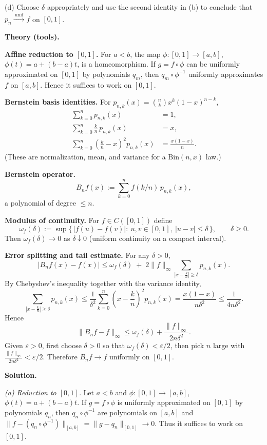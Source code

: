 \documentclass[12pt,a4paper]{article}
\begin{document}
\medskip
(d)\; Choose $\delta$ appropriately and use the second identity in (b) to conclude that
$p_n \xrightarrow{\ \mathrm{unif}\ } f$ on $[0,1]$.

\medskip
\textbf{Theory (tools).}

\textbf{Affine reduction to $[0,1]$.}
For $a<b$, the map $\phi:[0,1]\to[a,b]$, $\phi(t)=a+(b-a)t$, is a homeomorphism.
If $g=f\circ\phi$ can be uniformly approximated on $[0,1]$ by polynomials $q_m$, then
$q_m\circ\phi^{-1}$ uniformly approximates $f$ on $[a,b]$.
Hence it suffices to work on $[0,1]$.

\medskip
\textbf{Bernstein basis identities.}
For $p_{n,k}(x)=\binom{n}{k}x^k(1-x)^{n-k}$,
\[
\begin{aligned}
	\sum_{k=0}^{n} p_{n,k}(x) &= 1,\\[4pt]
	\sum_{k=0}^{n} \frac{k}{n}\,p_{n,k}(x) &= x,\\[4pt]
	\sum_{k=0}^{n}\!\left(\frac{k}{n}-x\right)^{\!2} p_{n,k}(x) &= \frac{x(1-x)}{n}.
\end{aligned}
\]
(These are normalization, mean, and variance for a $\mathrm{Bin}(n,x)$ law.)

\medskip
\textbf{Bernstein operator.}
\[
B_nf(x):=\sum_{k=0}^{n} f(k/n)\,p_{n,k}(x),
\]
a polynomial of degree $\le n$.

\medskip
\textbf{Modulus of continuity.}
For $f\in C([0,1])$ define
\[
\omega_f(\delta)
:=\sup\{\,|f(u)-f(v)|:\ u,v\in[0,1],\ |u-v|\le\delta\,\},\qquad \delta\ge0.
\]
Then $\omega_f(\delta)\to0$ as $\delta\downarrow0$ (uniform continuity on a compact interval).

\medskip
\textbf{Error splitting and tail estimate.}
For any $\delta>0$,
\[
|B_nf(x)-f(x)|
\le \omega_f(\delta)
\;+\; 2\|f\|_\infty \sum_{|x-\frac{k}{n}|\ge\delta} p_{n,k}(x).
\]
By Chebyshev’s inequality together with the variance identity,
\[
\sum_{|x-\frac{k}{n}|\ge\delta} p_{n,k}(x)
\le \frac{1}{\delta^2}\sum_{k=0}^{n}\!\left(x-\frac{k}{n}\right)^{\!2} p_{n,k}(x)
= \frac{x(1-x)}{n\delta^2}
\le \frac{1}{4n\delta^2}.
\]
Hence
\[
\boxed{\;
	\|B_nf-f\|_\infty
	\le \omega_f(\delta) + \frac{\|f\|_\infty}{2n\delta^2}.
	\;}
\]
Given $\varepsilon>0$, first choose $\delta>0$ so that $\omega_f(\delta)<\varepsilon/2$,
then pick $n$ large with $\frac{\|f\|_\infty}{2n\delta^2}<\varepsilon/2$.
Therefore $B_nf\to f$ uniformly on $[0,1]$.
	
	
	
	\textbf{Solution.}
	
	\emph{(a) Reduction to $[0,1]$.}
	Let $a<b$ and $\phi:[0,1]\to[a,b]$, $\phi(t)=a+(b-a)t$.
	If $g=f\circ\phi$ is uniformly approximated on $[0,1]$ by polynomials $q_n$,
	then $q_n\circ\phi^{-1}$ are polynomials on $[a,b]$ and
	$\|f-(q_n\circ\phi^{-1})\|_{[a,b]}=\|g-q_n\|_{[0,1]}\to0$.
	Thus it suffices to work on $[0,1]$.
	
\end{document}
